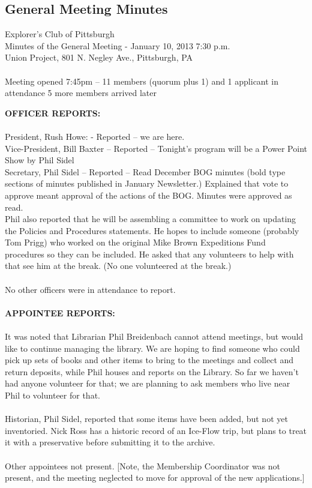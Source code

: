 \documentclass[10pt,a4paper]{article}
\newcommand\subsect[1]{%
  \subsection*{#1}%
  \addcontentsline{toc}{subsection}{#1}}
\begin{document}
\begin{multicols}{2}
\subsect{General Meeting Minutes}

Explorer's Club of Pittsburgh\\
Minutes of the General Meeting - January 10, 2013 7:30 p.m.\\
Union Project, 801 N. Negley Ave., Pittsburgh, PA
\\
\\
Meeting opened 7:45pm – 11 members (quorum plus 1) and 1 applicant in attendance
                                            5 more members arrived later

\textbf{OFFICER REPORTS:}
\\
\\
President, Rush Howe: - Reported – we are here.\\
Vice-President, Bill Baxter – Reported – Tonight's program will be a Power Point Show by Phil Sidel\\
Secretary, Phil Sidel – Reported – Read December BOG minutes (bold type sections of minutes published in January Newsletter.)  Explained that vote to approve meant approval of the actions of the BOG.  Minutes were approved as read.\\
Phil also reported that he will be assembling a committee to work on updating the Policies and Procedures statements.  He hopes to include someone (probably Tom Prigg) who worked on the original Mike Brown Expeditions Fund procedures so they can be included.  He asked that any volunteers to help with that see him at the break.  (No one volunteered at the break.)
\\
\\
No other officers were in attendance to report.
\\
\\
\textbf{APPOINTEE REPORTS:}
\\
\\
It was noted that Librarian Phil Breidenbach cannot attend meetings, but would like to continue managing the library.  We are hoping to find someone who could pick up sets of books and other items to bring to the meetings and collect and return deposits, while Phil houses and reports on the Library.
So far we haven't had anyone volunteer for that; we are planning to ask members who live near Phil to volunteer for that.
\\
\\
Historian, Phil Sidel, reported that some items have been added, but not yet inventoried.  Nick Ross has  a historic record of an Ice-Flow trip, but plans to treat it with a preservative before submitting it to the archive.
\\
\\
Other appointees not present.
[Note, the Membership Coordinator was not present, and the meeting neglected to move for approval of the new applications.]


\end{multicols}
\end{document}
